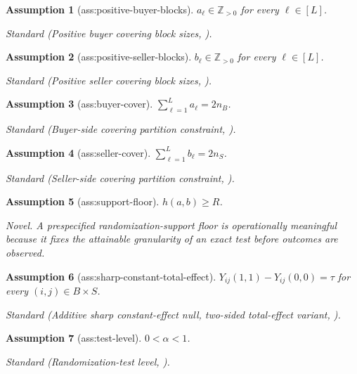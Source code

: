 \documentclass{article}
\newtheorem{assumption}{Assumption}
\begin{document}
\begin{assumption}[ass:positive-buyer-blocks]\label{ass:positive-buyer-blocks}
\(a_\ell\in\mathbb Z_{>0}\) for every \(\ell\in[L]\).
\par\smallskip\noindent\emph{Standard} (Positive buyer covering block sizes, \cite{LiuShaikhToulis2026}).
\end{assumption}

\begin{assumption}[ass:positive-seller-blocks]\label{ass:positive-seller-blocks}
\(b_\ell\in\mathbb Z_{>0}\) for every \(\ell\in[L]\).
\par\smallskip\noindent\emph{Standard} (Positive seller covering block sizes, \cite{LiuShaikhToulis2026}).
\end{assumption}

\begin{assumption}[ass:buyer-cover]\label{ass:buyer-cover}
\(\sum_{\ell=1}^{L}a_\ell=2n_B\).
\par\smallskip\noindent\emph{Standard} (Buyer-side covering partition constraint, \cite{LiuShaikhToulis2026}).
\end{assumption}

\begin{assumption}[ass:seller-cover]\label{ass:seller-cover}
\(\sum_{\ell=1}^{L}b_\ell=2n_S\).
\par\smallskip\noindent\emph{Standard} (Seller-side covering partition constraint, \cite{LiuShaikhToulis2026}).
\end{assumption}

\begin{assumption}[ass:support-floor]\label{ass:support-floor}
\(h(a,b)\ge R\).
\par\smallskip\noindent\emph{Novel.} A prespecified randomization-support floor is operationally meaningful because it fixes the attainable granularity of an exact test before outcomes are observed.
\end{assumption}

\begin{assumption}[ass:sharp-constant-total-effect]\label{ass:sharp-constant-total-effect}
\(Y_{ij}(1,1)-Y_{ij}(0,0)=\tau\) for every \((i,j)\in B\times S\).
\par\smallskip\noindent\emph{Standard} (Additive sharp constant-effect null, two-sided total-effect variant, \cite{LuoDasguptaXieLiu2021}).
\end{assumption}

\begin{assumption}[ass:test-level]\label{ass:test-level}
\(0<\alpha<1\).
\par\smallskip\noindent\emph{Standard} (Randomization-test level, \cite{BasseFellerToulis2019}).
\end{assumption}
\end{document}
